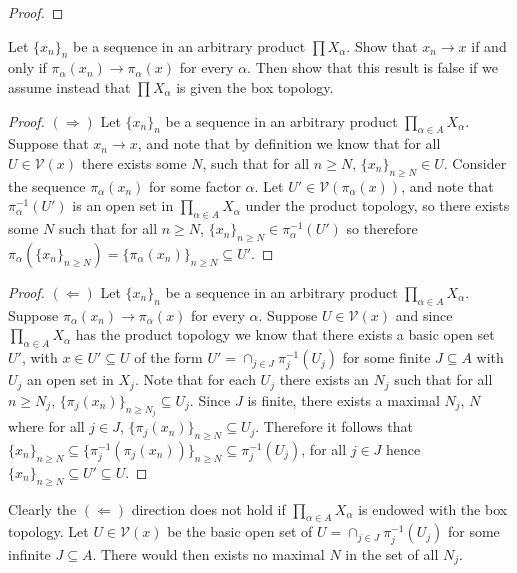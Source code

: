 \documentclass{homework651}
\begin{document}
\begin{problems}
\begin{subproblems}
\begin{proof}
\end{proof}
\end{subproblems}



\problem Let $\{x_n\}_n$ be a sequence in an arbitrary
product $\prod X_\alpha$. Show that $x_n\to x$ if 
and only if $\pi_\alpha(x_n)\to \pi_\alpha(x)$ for every $\alpha$.
Then show that this result is false if we assume
instead that $\prod X_\alpha$ is given the box topology.
\begin{proof} $(\Rightarrow)$ Let $\{x_n\}_n$ be a sequence in an arbitrary product $\prod_{\alpha \in A} X_\alpha$. Suppose that $x_n \to x$, and note that by definition
    we know that for all $U \in \mathcal{V}(x)$ there exists some $N$, such that for all $n \geq N$, $\{x_n\}_{n \geq N} \in U$. 
    Consider the sequence $\pi_\alpha(x_n)$ for some factor $\alpha$. Let $U' \in \mathcal{V}(\pi_\alpha(x))$, and note that $\pi^{-1}_\alpha(U')$ is an open set in $\prod_{\alpha \in A} X_\alpha$ under the product topology, so there exists some $N$ such that for all $n \geq N$, $\{x_n\}_{n \geq N} \in \pi^{-1}_\alpha(U')$ so therefore $\pi_{\alpha}(\{x_n\}_{n \geq N}) = \{\pi_{\alpha}(x_n)\}_{n \geq N} \subseteq U'$.
\end{proof}

\begin{proof}$(\Leftarrow)$ Let $\{x_n\}_n$ be a sequence in an arbitrary product $\prod_{\alpha \in A} X_\alpha$. Suppose $\pi_\alpha(x_n)\to \pi_\alpha(x)$ for every $\alpha$.
    Suppose $U \in \mathcal{V}(x)$ and since $\prod_{\alpha \in A} X_\alpha$ has the product topology we know that there exists a basic open set $U'$, with $x \in U'\subseteq U$
    of the form $U' = \cap_{j \in J} \pi_j^{-1}(U_j)$ for some finite $J \subseteq A$ with $U_j$ an open set in $X_j$.
    Note that for each $U_j$ there exists an $N_j$ such that for all $n \geq N_j$, $\{\pi_j(x_n)\}_{n \geq N_j} \subseteq U_j$. Since $J$ is finite, 
    there exists a maximal $N_j$, $N$ where for all $j \in J$, $\{\pi_j(x_n)\}_{n \geq N} \subseteq U_j$. Therefore it follows that $\{x_n\}_{n \geq N}  \subseteq  \{\pi_j^{-1}( \pi_j(x_n) )\}_{n \geq N} \subseteq \pi_j^{-1}(U_j)$, for all $j \in J$ hence $\{x_n\}_{n \geq N} \subseteq U' \subseteq U$. 
\end{proof}

Clearly the $(\Leftarrow)$ direction does not hold if $\prod_{\alpha \in A} X_\alpha$ is endowed with the box topology. Let $U \in \mathcal{V}(x)$ be the basic open set of $U = \cap_{j \in J} \pi_j^{-1}(U_j)$ for some infinite $J \subseteq A$. There would then exists no maximal $N$ in the set of all $N_j$.





\end{problems}
\end{document}
